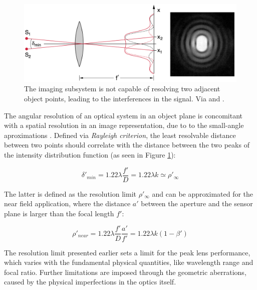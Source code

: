 \begin{figure}[h]
  \centering
  \includegraphics[width=\linewidth]{imgs/optics/airy-limit.png}
  \caption{The imaging subsystem is not capable of resolving two adjacent object points, leading to the interferences in the signal. Via \cite{Cagnet1962} and \cite{Demtroeder2018}.}
  \label{fig:airylimit}
\end{figure}
The angular resolution of an optical system in an object plane is concomitant with a spatial resolution in an image representation, due to to the small-angle aproximations \cite{Pedrotti2007}. Defined via \textit{Rayleigh criterion}, the least resolvable distance between two points should correlate with the distance between the two peaks of the intensity distribution function (as seen in Figure \ref{fig:airylimit}):

\begin{displaymath}
  {\delta}'_{min} =  1.22 \lambda \frac{{f}'}{D} = 1.22 \lambda k \simeq {\rho}'_{\infty } 
\end{displaymath}

The latter is defined as the resolution limit ${\rho}'_{\infty}$ and can be approximated for the near field application, where the distance ${a}'$ between the aperture and the sensor plane is larger than the focal length ${f}'$:

\begin{displaymath}
{\rho}'_{near}  =  1.22 \lambda \frac{{f}'}{D} \frac{{a}'}{{f}'}= 1.22 \lambda k (1 - {\beta}' )
\end{displaymath}

The resolution limit presented earlier sets a limit for the peak lens performance, which varies with the fundamental physical quantities, like wavelength range and focal ratio.  
Further limitations are imposed through the geometric aberrations, caused by the physical imperfections in the optics itself.

